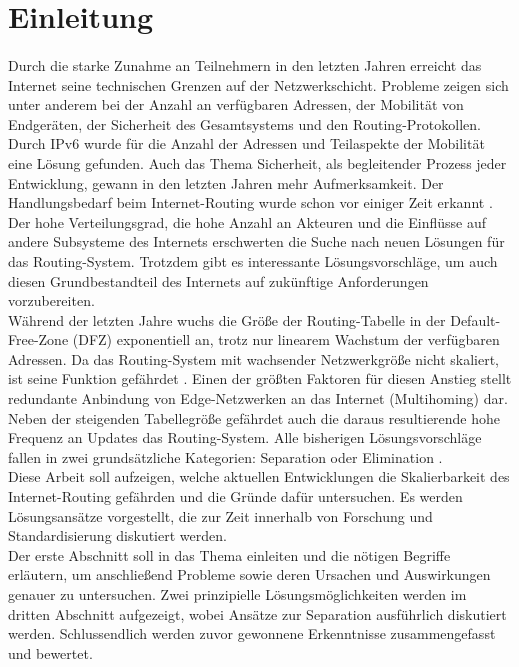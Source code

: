 \section{Einleitung}

\paragraph{}
Durch die starke Zunahme an Teilnehmern in den letzten Jahren erreicht das Internet seine technischen Grenzen auf der Netzwerkschicht. Probleme zeigen sich unter anderem bei der Anzahl an verfügbaren Adressen, der Mobilität von Endgeräten, der Sicherheit des Gesamtsystems und den Routing-Protokollen. Durch IPv6 wurde für die Anzahl der Adressen und Teilaspekte der Mobilität eine Lösung gefunden. Auch das Thema Sicherheit, als begleitender Prozess jeder Entwicklung, gewann in den letzten Jahren mehr Aufmerksamkeit. Der Handlungsbedarf beim Internet-Routing wurde schon vor einiger Zeit erkannt \cite{deering:1996:map}. Der hohe Verteilungsgrad, die hohe Anzahl an Akteuren und die Einflüsse auf andere Subsysteme des Internets erschwerten die Suche nach neuen Lösungen für das Routing-System. Trotzdem gibt es interessante Lösungsvorschläge, um auch diesen Grundbestandteil des Internets auf zukünftige Anforderungen vorzubereiten. \\
 
Während der letzten Jahre wuchs die Größe der Routing-Tabelle in der Default-Free-Zone (DFZ) exponentiell an, trotz nur linearem Wachstum der verfügbaren Adressen\cite{huston:2001:analyzing}. Da das Routing-System mit wachsender Netzwerkgröße nicht skaliert, ist seine Funktion gefährdet \cite{jen:2008:start}. Einen der größten Faktoren für diesen Anstieg stellt redundante Anbindung von Edge-Netzwerken an das Internet (Multihoming) dar. Neben der steigenden Tabellegröße gefährdet auch die daraus resultierende hohe Frequenz an Updates das Routing-System. Alle bisherigen Lösungsvorschläge fallen in zwei grundsätzliche Kategorien: Separation oder Elimination \cite{jen:2008:start}. \\

Diese Arbeit soll aufzeigen, welche aktuellen Entwicklungen die Skalierbarkeit des Internet-Routing gefährden und die Gründe dafür untersuchen. Es werden Lösungsansätze vorgestellt, die zur Zeit innerhalb von Forschung und Standardisierung diskutiert werden. \\

Der erste Abschnitt soll in das Thema einleiten und die nötigen Begriffe erläutern, um anschließend Probleme sowie deren Ursachen und Auswirkungen genauer zu untersuchen. Zwei prinzipielle Lösungsmöglichkeiten werden im dritten Abschnitt aufgezeigt, wobei Ansätze zur Separation ausführlich diskutiert werden. Schlussendlich werden zuvor gewonnene Erkenntnisse zusammengefasst und bewertet.

 
